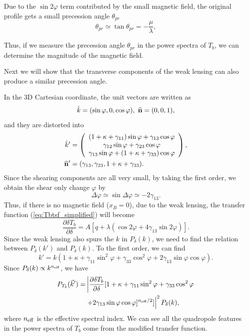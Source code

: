Due to the $\sin 2\varphi$ term contributed by the small magnetic field, the original profile gets a small precession angle $\theta_{pr}$
\begin{equation}
\theta_{pr}\simeq\tan\theta_{pr}=-\frac{\mu}{\lambda},
\end{equation}

Thus, if we measure the precession angle $\theta_{pr}$ in the power spectra of $T_b$, we can determine the magnitude of the magnetic field.

Next we will show that the transverse components of the weak lensing can also produce a similar precession angle.

In the 3D Cartesian coordinate, the unit vectors are written as
\begin{equation}
\hat{k}=(\sin\varphi,0,\cos\varphi),\ {\bf{\widehat n}}=(0,0,1),
\end{equation}
and they are distorted into
\begin{align}
\hat{k}'&=\left(\begin{array}{c}
(1+\kappa+\gamma_{11})\sin\varphi+\gamma_{13}\cos\varphi\\
\gamma_{12}\sin\varphi+\gamma_{23}\cos\varphi\\
\gamma_{13}\sin\varphi+(1+\kappa+\gamma_{33})\cos\varphi
\end{array}\right),\nonumber\\
{\bf{\widehat n}}'&=(\gamma_{13},\gamma_{23},1+\kappa+\gamma_{33}).
\end{align}
Since the shearing components are all very small, by taking the first order, we obtain the shear only change $\varphi$ by
\begin{equation}
\Delta\varphi\simeq\sin\Delta\varphi\simeq-2\gamma_{13}.
\end{equation}
Thus, if there is no magnetic field ($x_B=0$), due to the weak lensing, the transfer function (\ref{eq:Tbtsf_simplified}) will become
\begin{equation}
\frac{\partial\delta T_b}{\partial\delta}=A[q+\lambda(\cos 2\varphi+4\gamma_{13}\sin 2\varphi)].
\label{eq:Tbtsf_shear}
\end{equation}
Since the weak lensing also spurs the $k$ in $P_\delta(k)$, we need to find the relation between $P_\delta(k')$ and $P_\delta(k)$. To the first order, we can find
\begin{equation}
k'=k(1+\kappa+\gamma_{11}\sin^2\varphi+\gamma_{33}\cos^2\varphi+2\gamma_{13}\sin\varphi\cos\varphi).
\end{equation}
Since $P_\delta(k)\propto k^{n_{\rm eff}}$, we have
\begin{align}
P_{T_b}(\vec{k}')=&\left\vert\frac{\partial\delta T_b}{\partial\delta}[1+\kappa+\gamma_{11}\sin^2\varphi+\gamma_{33}\cos^2\varphi\right.\nonumber\\
&\left.+2\gamma_{13}\sin\varphi\cos\varphi]^{n_{\rm eff}/2}]\right\vert^2P_\delta(k),
\end{align}
where $n_{\rm eff}$ is the effective spectral index. We can see all the quadropole features in the power spectra of $T_b$ come from the modified transfer function.

